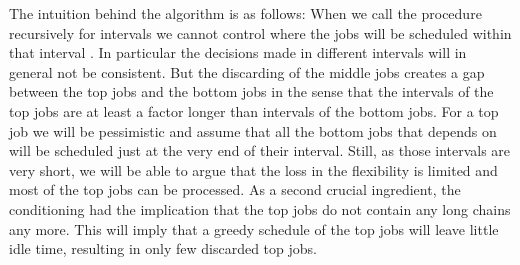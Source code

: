\documentclass[11pt,letterpaper,oneside,english]{article}
\theoremstyle{theorem}
\begin{document}
The intuition behind the algorithm is as follows:  When we call the procedure recursively for intervals 
we cannot control where the jobs  will be scheduled within that interval . In particular the
decisions made in different intervals  will in general not be consistent.
But the discarding of the middle jobs creates a gap between the top 
jobs and the bottom jobs in the sense that the intervals of the top jobs are at least a factor 
longer than intervals of the bottom jobs. For a top job  we will be pessimistic and
assume that all the bottom jobs that  depends on will be scheduled just at the very end of their
interval. Still, as those intervals are very short, we will be able to argue that the loss in the
flexibility is limited and most of the top jobs can be processed. As a second crucial ingredient, the
conditioning had the implication that the top jobs do not contain any long chains any more.
This will imply that a greedy
schedule of the top jobs will leave little idle time, resulting in only few discarded top jobs.
\end{document}
